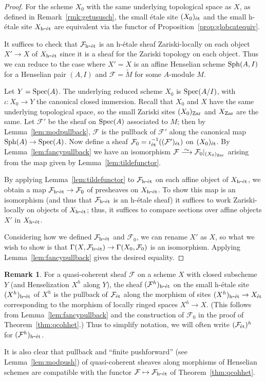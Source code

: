 \documentclass[12pt]{article}
\newcommand\simto{\stackrel{\textstyle\sim}{\smash{\longrightarrow}\rule{0pt}{0.4ex}}}
\newcommand{\F}{\mathcal{F}}
\newcommand{\spec}{{\rm Spec}}
\newcommand{\sph}{{\rm Sph}}
\newcommand{\Et}{\'etale\xspace}
\newcommand{\hetale}{h-\'etale\xspace}
\newcommand{\et}{{\rm\acute{e}t}}
\newcommand{\het}{{\rm h\mbox{-}\et}}
\newcommand{\zar}{{\rm Zar}}
\theoremstyle{definition}
\newtheorem{remark}[theorem]{Remark}
\numberwithin{equation}{subsection}
\begin{document}
\thmqcohhet

\begin{proof} 

For the scheme $X_0$ with the same underlying topological space as $X$, as defined in Remark~\ref{rmk:getususch}, the small \Et site $(X_0)_{\et}$ and the small \hetale site $X_{\het}$ are equivalent via the functor of Proposition~\ref{prop:globcatequiv}. 

It suffices to check that $\F_{\het}$ is an \hetale sheaf Zariski-locally on each object $X' \to X$ of $X_{\het}$ since it is a sheaf for the Zariski topology on each object. Thus we can reduce to the case where $X'=X$ is an affine Henselian scheme $\sph(A,I)$ for a Henselian pair $(A,I)$ and $\F=\widetilde{M}$ for some $A$-module $M$.

Let $Y=\spec(A)$. The underlying reduced scheme $X_0$ is $\spec(A/I)$, with $\iota: X_0 \to Y$ the canonical closed immersion. Recall that $X_0$ and $X$ have the same underlying topological space, so the small Zariski sites $(X_0)_{\zar}$ and $X_{\zar}$ are the same. Let $\F'$  be the sheaf on $\spec(A)$ associated to $M$; then by Lemma~\ref{lem:modpullback}, $\F$ is the pullback of $\F'$ along the canonical map $\sph(A) \to \spec(A)$. Now define a sheaf $\F_0 = \iota_{\et}^{-1}((\F')_{\et})$ on $(X_0)_{\et}$. By Lemma~\ref{lem:fancypullback} we have an isomorphism $\F \simto \F_0|_{(X_0)_{\zar}}$ arising from the map given by Lemma~\ref{lem:tildefunctor}. 

By applying Lemma~\ref{lem:tildefunctor} to $\F_{\het}$ on each affine object of $X_{\het}$, we obtain a map $\F_{\het} \to \F_0$ of presheaves on $X_{\het}$. To show this map is an isomorphism (and thus that $\F_{\het}$ is an \hetale sheaf) it suffices to work Zariski-locally on objects of $X_{\het}$; thus, it suffices to compare sections over affine objects $X'$ in $X_{\het}$.  

Considering how we defined $\F_{\het}$ and $\F_0$, we can rename $X'$ as $X$, so what we wish to show is that $\Gamma(X, \F_{\het}) \to \Gamma(X_0,\F_0)$ is an isomorphism. Applying Lemma~\ref{lem:fancypullback} gives the desired equality.
 \end{proof}




\begin{remark}\label{rmk:morhet} For a quasi-coherent sheaf $\F$ on a scheme $X$ with closed subscheme $Y$ (and Henselization $X^h$ along $Y$), the sheaf $(\F^h)_{\het}$ on the small \hetale site $(X^h)_{\het}$ of $X^h$ is the pullback of $\F_{\et}$ along the morphism of sites $(X^h)_{\het} \to X_{\et}$ corresponding to the morphism of locally ringed spaces $X^h \to X$. (This follows from Lemma~\ref{lem:fancypullback} and the construction of $\F_0$ in the proof of Theorem~\ref{thm:qcohhet}.) Thus to simplify notation, we will often write $(\F_{\et})^h$ for $(\F^h)_{\het}$.

It is also clear that pullback and ``finite pushforward'' (see Lemma~\ref{lem:modpush}) of quasi-coherent sheaves along morphisms of Henselian schemes are compatible with the functor $\F \mapsto \F_{\het}$ of Theorem~\ref{thm:qcohhet}. 

\end{remark}
\end{document}

